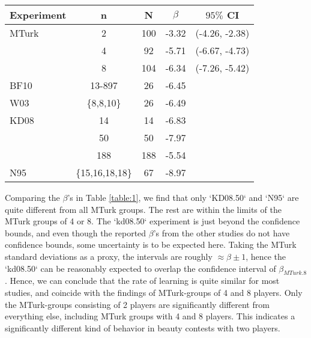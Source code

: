 \documentclass[12pt,review]{elsarticle}
\begin{document}
\begin{SCtable}
\begin{tabular}{lcccc}
\hline
Experiment	& n & N 	& $\beta$ & $95\%$ CI \\
\hline
MTurk	&	2			&	100	&	-3.32 & 	(-4.26, -2.38)	\\
	   	&	4			&	92 	&	-5.71 &	(-6.67, -4.73)	\\
	   	&	8			&	104	&	-6.34 &	(-7.26, -5.42)	\\
BF10	&	13-897		&	26	&	-6.45 &\\
W03  	& \{8,8,10\} 	&	26	&	-6.49 &\\
KD08	& 14 			& 14 	&	-6.83 &\\
	   	& 50 			& 50 	&	-7.97 &\\
	   	& 188 			& 188 	&	-5.54 &\\
N95		&\{15,16,18,18\}& 67 	&	-8.97 &\\
\hline
\end{tabular}
\caption{Rates of learning in iterated p-beauty contest experiments with $p=2/3$. n = group size; N = number of subjects; $\beta$ = slope coefficient of means from round 1 to round 4 (for BF10, $\beta$ is calculated from round 1 to round 2 only).}
\label{table:1}
\end{SCtable}

Comparing the $\beta$'s in Table \ref{table:1}, we find that only `KD08.50` and `N95` are quite different from all MTurk groups. The rest are within the limits of the MTurk groups of 4 or 8. The `kd08.50` experiment is just beyond the confidence bounds, and even though the reported $\beta$'s from the other studies do not have confidence bounds, some uncertainty is to be expected here. Taking the MTurk standard deviations as a proxy, the intervals are roughly $\approx\beta\pm1$, hence the `kd08.50` can be reasonably expected to overlap the confidence interval of $\beta_{MTurk.8}$. Hence, we can conclude that the rate of learning is quite similar for most studies, and coincide with the findings of MTurk-groups of 4 and 8 players. Only the MTurk-groups consisting of 2 players are significantly different from everything else, including MTurk groups with 4 and 8 players. This indicates a significantly different kind of behavior in beauty contests with two players.
\end{document}
